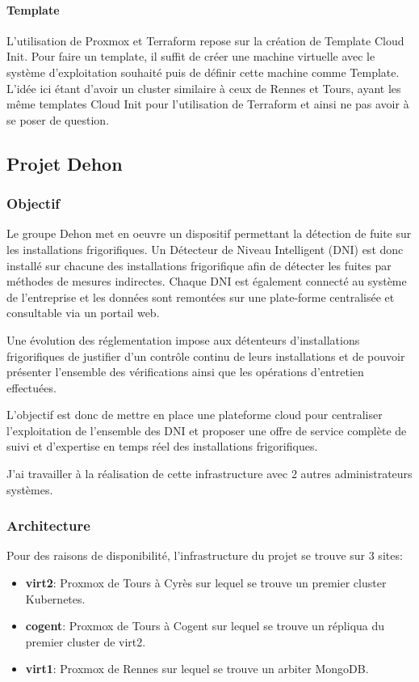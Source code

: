 \documentclass[12pt]{article}
\begin{document}
\paragraph{Template}
L'utilisation de Proxmox et Terraform repose sur la création de Template Cloud Init.
Pour faire un template, il suffit de créer une machine virtuelle avec le système d'exploitation souhaité puis de définir cette machine comme Template.
L'idée ici étant d'avoir un cluster similaire à ceux de Rennes et Tours, ayant les même templates Cloud Init pour l'utilisation de Terraform et ainsi ne pas avoir à se poser de question.

\newpage
\subsection{Projet Dehon} \label{dehon}
\subsubsection{Objectif}

Le groupe Dehon met en oeuvre un dispositif permettant la détection de fuite sur les installations frigorifiques. 
Un Détecteur de Niveau Intelligent (DNI) est donc installé sur chacune des installations frigorifique afin de détecter les fuites par méthodes de mesures indirectes.
Chaque DNI est également connecté au système de l'entreprise et les données sont remontées sur une plate-forme centralisée et consultable via un portail web. 

Une évolution des réglementation impose aux détenteurs d'installations frigorifiques de justifier d'un contrôle continu de leurs installations et de pouvoir présenter l'ensemble des vérifications ainsi que les opérations d'entretien effectuées.

L'objectif est donc de mettre en place une plateforme cloud pour centraliser l'exploitation de l'ensemble des DNI et proposer une offre de service complète de suivi et d'expertise en temps réel des installations frigorifiques.

J'ai travailler à la réalisation de cette infrastructure avec 2 autres administrateurs systèmes.

\subsubsection{Architecture}
Pour des raisons de disponibilité, l'infrastructure du projet se trouve sur 3 sites:
\begin{itemize}
    \item \textbf{virt2}: Proxmox de Tours à Cyrès sur lequel se trouve un premier cluster Kubernetes.
    \item \textbf{cogent}: Proxmox de Tours à Cogent sur lequel se trouve un répliqua du premier cluster de virt2.
    \item \textbf{virt1}: Proxmox de Rennes sur lequel se trouve un arbiter MongoDB. 
\end{itemize}
\end{document}
